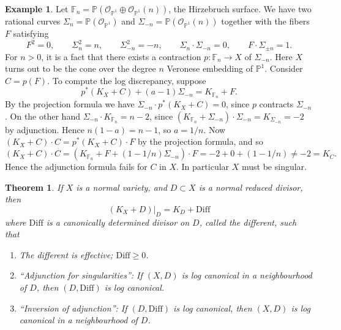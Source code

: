 \documentclass{article}
\newtheorem*{theorem}{Theorem}
\theoremstyle{definition}
\newtheorem*{example}{Example}
\newcommand{\Diff}{\mathrm{Diff}}
\renewcommand{\O}{\mathcal{O}}
\renewcommand{\P}{\mathbb{P}}
\newcommand{\F}{\mathbb{F}}
\begin{document}
\begin{example}
    Let $\F_n=\P(\O_{\P^1}\oplus\O_{\P^1}(n))$, the Hirzebruch surface. We have
    two rational curves $\Sigma_n=\P(\O_{\P^1})$ and
    $\Sigma_{-n}=\P(\O_{\P^1}(n))$ together with the fibers $F$ satisfying
    \begin{equation*}
        F^2=0, \qquad \Sigma_n^2=n, \qquad \Sigma_{-n}^2=-n, \qquad
        \Sigma_n\cdot\Sigma_{-n}=0, \qquad F\cdot\Sigma_{\pm n}=1.
    \end{equation*}
    For $n>0$, it is a fact that there exists a contraction $p:\F_n\to X$ of
    $\Sigma_{-n}$. Here $X$ turns out to be the cone over the degree $n$
    Veronese embedding of $\P^1$. Consider $C=p(F)$. To compute the log
    discrepancy, suppose
    \begin{equation*}
        p^*(K_X+C) + (a-1)\Sigma_{-n} = K_{\F_n} + F.
    \end{equation*}
    By the projection formula we have $\Sigma_{-n}\cdot p^*(K_X+C)=0$, since $p$
    contracts $\Sigma_{-n}$. On the other hand $\Sigma_{-n}\cdot K_{\F_n}=n-2$,
    since $(K_{\F_n}+\Sigma_{-n})\cdot\Sigma_{-n}=K_{\Sigma_{-n}}=-2$ by
    adjunction. Hence $n(1-a) =n-1$, so $a=1/n$. Now
    $(K_X+C)\cdot C=p^*(K_X+C)\cdot F$ by the projection formula, and so
    \begin{equation*}
        (K_X+C)\cdot C
            = (K_{\F_n}+F+(1-1/n)\Sigma_{-n})\cdot F
            = -2 + 0 + (1-1/n)
            \ne -2 = K_C.
    \end{equation*}
    Hence the adjunction formula fails for $C$ in $X$. In particular $X$ must be
    singular.
\end{example}

\begin{theorem}
    If $X$ is a normal variety, and $D\subset X$ is a normal reduced divisor,
    then
    \begin{equation*}
        (K_X+D)|_D = K_D + \Diff
    \end{equation*}
    where $\Diff$ is a canonically determined divisor on $D$, called the
    \emph{different}, such that
    \begin{enumerate}
        \item The different is effective; $\Diff\ge0$.

        \item ``Adjunction for singularities'': If $(X,D)$ is log canonical in a
            neighbourhood of $D$, then $(D,\Diff)$ is log canonical.

        \item ``Inversion of adjunction'': If $(D,\Diff)$ is log canonical, then
            $(X,D)$ is log canonical in a neighbourhood of $D$.
    \end{enumerate}
\end{theorem}
\end{document}
